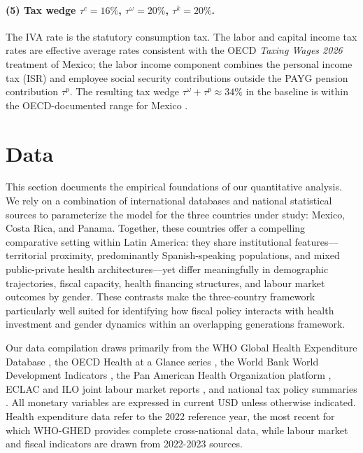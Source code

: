 \documentclass[12pt,a4paper]{article}
\begin{document}
\paragraph{(5) Tax wedge $\tau^{c} = 16\%$, $\tau^{\omega} = 20\%$, $\tau^{k} = 20\%$.}
The IVA rate is the statutory consumption tax. The labor and capital
income tax rates are effective average rates consistent with the OECD
\textit{Taxing Wages 2026} treatment of Mexico; the labor income
component combines the personal income tax (ISR) and employee social
security contributions outside the PAYG pension contribution $\tau^{p}$.
The resulting tax wedge $\tau^{\omega} + \tau^{p} \approx 34\%$ in the
baseline is within the OECD-documented range for Mexico
\citep{OECDTaxingWages2026}.


\section{Data}\label{sec:data}

This section documents the empirical foundations of our quantitative
analysis. We rely on a combination of international databases and
national statistical sources to parameterize the model for the three
countries under study: Mexico, Costa Rica, and Panama. Together, these
countries offer a compelling comparative setting within Latin America:
they share institutional features---territorial proximity,
predominantly Spanish-speaking populations, and mixed public-private
health architectures---yet differ meaningfully in demographic
trajectories, fiscal capacity, health financing structures, and labour
market outcomes by gender. These contrasts make the three-country
framework particularly well suited for identifying how fiscal policy
interacts with health investment and gender dynamics within an
overlapping generations framework.

Our data compilation draws primarily from the WHO Global Health
Expenditure Database \citep{WHOGHED2024}, the OECD Health at a Glance
series \citep{OECDHaG2023}, the World Bank World Development
Indicators \citep{WorldBankWDI2024}, the Pan American Health
Organization platform \citep{PAHOHIA2024}, ECLAC and ILO joint labour
market reports \citep{ECLACILO2023}, and national tax policy summaries
\citep{PwCWWTS2024, OECDRevStats2024}. All monetary variables are
expressed in current USD unless otherwise indicated. Health expenditure
data refer to the 2022 reference year, the most recent for which
WHO-GHED provides complete cross-national data, while labour market
and fiscal indicators are drawn from 2022-2023 sources.
\end{document}
